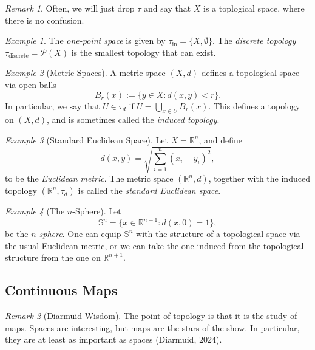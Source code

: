 \documentclass[a4paper]{report}
\theoremstyle{definition}
\theoremstyle{remark}
\newtheorem{remark}{Remark}
\theoremstyle{proposition}
\theoremstyle{conjecture}
\theoremstyle{lemma}
\theoremstyle{corollary}
\theoremstyle{exercise}
\newtheorem{example}{Example}
\newcommand{\mcal}{\mathcal}
\newcommand{\on}{\operatorname}
\begin{document}
\begin{remark}
    Often, we will just drop $\tau$ and say that $X$ is a toplogical space, where
    there is no confusion.
\end{remark}

\begin{example}
    The \emph{one-point space} is given by 
    $\tau_{\on{in}} = \lbrace X,\emptyset\rbrace$.
    The \emph{discrete topology} $\tau_{\on{discrete}} = \mcal{P}(X)$ is the smallest topology
    that can exist.
\end{example}

\begin{example}[Metric Spaces]
    A metric space $(X,d)$ defines a topological space via open balls
    $$B_r(x) := \lbrace y \in X : d(x,y) < r\rbrace.$$
    In particular, we say that $U \in \tau_d$ if $U = \bigcup_{x \in U}B_r(x)$.
    This defines a topology on $(X,d)$, and is sometimes called the 
    \emph{induced topology}.
\end{example}

\begin{example}[Standard Euclidean Space]
    Let $X = \mathbb{R}^n$, and define 
    $$d(x,y) = \sqrt{\sum_{i=1}^n (x_i-y_i)^2},$$
    to be the \emph{Euclidean metric}. The metric space $(\mathbb{R}^n,d)$, 
    together with the induced topology
    $(\mathbb{R}^n,\tau_{d})$ is called the \emph{standard Euclidean space}.
\end{example}

\begin{example}[The $n$-Sphere]
    Let $$\mathbb{S}^n = \lbrace x \in \mathbb{R}^{n+1} : d(x,0) = 1\rbrace,$$
    be the \emph{$n$-sphere}. One can equip $\mathbb{S}^n$ with the structure
    of a topological space via the usual Euclidean metric, or we can take the one
    induced from the topological structure from the one on $\mathbb{R}^{n+1}$.
\end{example}

\subsection{Continuous Maps}

\begin{remark}[Diarmuid Wisdom]
    The point of topology is that it is the study of maps. Spaces are 
    interesting, but maps are the stars of the show. In particular, they are at 
    least as important as spaces (Diarmuid, 2024).
\end{remark}
\end{document}
